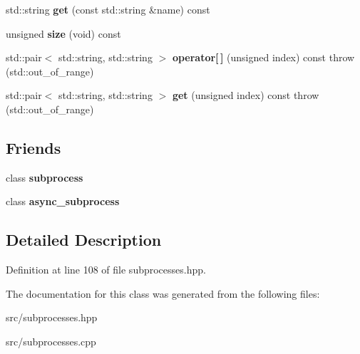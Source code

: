 \begin{DoxyCompactItemize}
\item 
std\+::string {\bfseries get} (const std\+::string \&name) const \hypertarget{classstlplus_1_1env__vector_a9e77969a06b67ad3797cdb5035df0524}{}\label{classstlplus_1_1env__vector_a9e77969a06b67ad3797cdb5035df0524}

\item 
unsigned {\bfseries size} (void) const \hypertarget{classstlplus_1_1env__vector_a394f52440dc79beab2ac22bc14c3b5a2}{}\label{classstlplus_1_1env__vector_a394f52440dc79beab2ac22bc14c3b5a2}

\item 
std\+::pair$<$ std\+::string, std\+::string $>$ {\bfseries operator\mbox{[}$\,$\mbox{]}} (unsigned index) const   throw (std\+::out\+\_\+of\+\_\+range)\hypertarget{classstlplus_1_1env__vector_af63d565b56afecd51061b4dcc562015c}{}\label{classstlplus_1_1env__vector_af63d565b56afecd51061b4dcc562015c}

\item 
std\+::pair$<$ std\+::string, std\+::string $>$ {\bfseries get} (unsigned index) const   throw (std\+::out\+\_\+of\+\_\+range)\hypertarget{classstlplus_1_1env__vector_a3a19b12b7442eda3e521e0ec7b51fec5}{}\label{classstlplus_1_1env__vector_a3a19b12b7442eda3e521e0ec7b51fec5}

\end{DoxyCompactItemize}
\subsection*{Friends}
\begin{DoxyCompactItemize}
\item 
class {\bfseries subprocess}\hypertarget{classstlplus_1_1env__vector_af130dc2be47597840787c3b78cef17f1}{}\label{classstlplus_1_1env__vector_af130dc2be47597840787c3b78cef17f1}

\item 
class {\bfseries async\+\_\+subprocess}\hypertarget{classstlplus_1_1env__vector_adc44cc81706632407a5720f5786ee6c2}{}\label{classstlplus_1_1env__vector_adc44cc81706632407a5720f5786ee6c2}

\end{DoxyCompactItemize}


\subsection{Detailed Description}


Definition at line 108 of file subprocesses.\+hpp.



The documentation for this class was generated from the following files\+:\begin{DoxyCompactItemize}
\item 
src/subprocesses.\+hpp\item 
src/subprocesses.\+cpp\end{DoxyCompactItemize}
